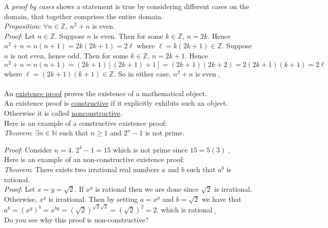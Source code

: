 \documentclass[12pt]{amsart}
\theoremstyle{definition}
\theoremstyle{remark}
\newcommand{\nats}{\mathbb N}
\newcommand{\ints}{\mathbb Z}
\begin{document}
\newpage

A \emph{proof by cases} shows a statement is true by considering different cases on the domain, that together comprises the entire domain.\\

\emph{Proposition}:  $\forall n\in\ints$, $n^2+n$ is even.\\

\emph{Proof}:  Let $n\in\ints$.  Suppose $n$ is even.  Then for some $k\in\ints$, $n=2k$.  Hence $n^2+n=n(n+1)=2k(2k+1)=2\ell$ where $\ell=k(2k+1)\in\ints$.  Suppose $n$ is not even, hence odd.  Then for some $k\in\ints$, $n=2k+1$.  Hence $n^2+n=n(n+1)=(2k+1)[(2k+1)+1]=(2k+1)(2k+2)=2(2k+1)(k+1)=2\ell$ where $\ell=(2k+1)(k+1)\in\ints$.  So in either case, $n^2+n$ is even$\;_{\square}$\\ \\


An \underline{existence proof} proves the existence of a mathematical object.\\

An existence proof is \underline{constructive} if it explicitly exhibits such an object.  Otherwise it is called \underline{nonconstructive}.\\

Here is an example of a constructive existence proof:\\


\emph{Theorem}:  $\exists n\in\nats$ such that $n\geq 1$ and $2^n -1$ is not prime.

\bigskip


\emph{Proof}:  Consider $n=4$.  $2^4 -1=15$ which is not prime since $15=5(3)\;_{\square}$\\


Here is an example of an non-constructive existence proof:\\


\emph{Theorem}:  There exists two irrational real numbers $a$ and $b$ such that $a^{b}$ is rational.\\

\emph{Proof}:  Let $x=y=\sqrt{2}$.  If $x^{y}$ is rational then we are done since $\sqrt{2}$ is irrational.  Otherwise, $x^{y}$ is irrational.  Then by setting $a=x^{y}$ and $b=\sqrt{2}$ we have that $a^{b}=(x^{y})^{b}=x^{by}=(\sqrt{2})^{\sqrt{2}\sqrt{2}}=(\sqrt{2})^{2}=2$, which is rational$\;_{\square}$\\


Do you see why this proof is non-constructive?
\end{document}
